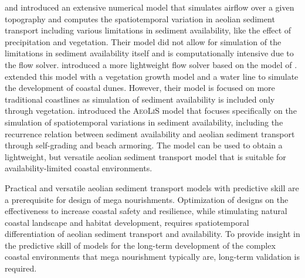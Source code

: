 \citet{vanDijk1999} and \citet{vanBoxtel1999} introduced an extensive
numerical model that simulates airflow over a given topography and
computes the spatiotemporal variation in aeolian sediment transport
including various limitations in sediment availability, like the
effect of precipitation and vegetation. Their model did not allow for
simulation of the limitations in sediment availability itself and is
computationally intensive due to the flow solver. \citet{Kroy2002}
introduced a more lightweight flow solver based on the model of
\citet{Weng1991}. \citet{Duran2013} extended this model with a
vegetation growth model and a water line to simulate the development
of coastal dunes. However, their model is focused on more traditional
coastlines as simulation of sediment availability is included only
through vegetation. \citet{Hoonhout2016} introduced the
\textsc{AeoLiS} model that focuses specifically on the simulation of
spatiotemporal variations in sediment availability, including the
recurrence relation between sediment availability and aeolian sediment
transport through self-grading and beach armoring. The model can be
used to obtain a lightweight, but versatile aeolian sediment transport
model that is suitable for availability-limited coastal environments.

%
%

Practical and versatile aeolian sediment transport models with
predictive skill are a prerequisite for design of mega
nourishments. Optimization of designs on the effectiveness to increase
coastal safety and resilience, while stimulating natural coastal
landscape and habitat development, requires spatiotemporal
differentiation of aeolian sediment transport and availability. To
provide insight in the predictive skill of models for the long-term
development of the complex coastal environments that mega nourishment
typically are, long-term validation is required.

